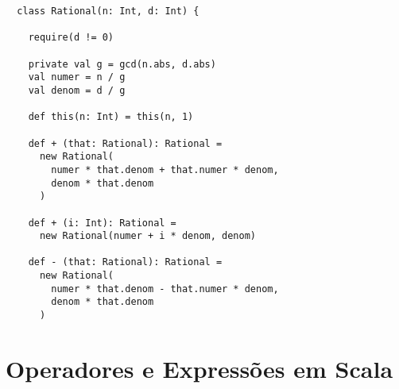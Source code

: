     \begin{lstlisting}
  class Rational(n: Int, d: Int) {

    require(d != 0)

    private val g = gcd(n.abs, d.abs)
    val numer = n / g
    val denom = d / g

    def this(n: Int) = this(n, 1)

    def + (that: Rational): Rational =
      new Rational(
        numer * that.denom + that.numer * denom,
        denom * that.denom
      )

    def + (i: Int): Rational =
      new Rational(numer + i * denom, denom)

    def - (that: Rational): Rational =
      new Rational(
        numer * that.denom - that.numer * denom,
        denom * that.denom
      )
    \end{lstlisting}
    \section{Operadores e Express\~{o}es em Scala}


